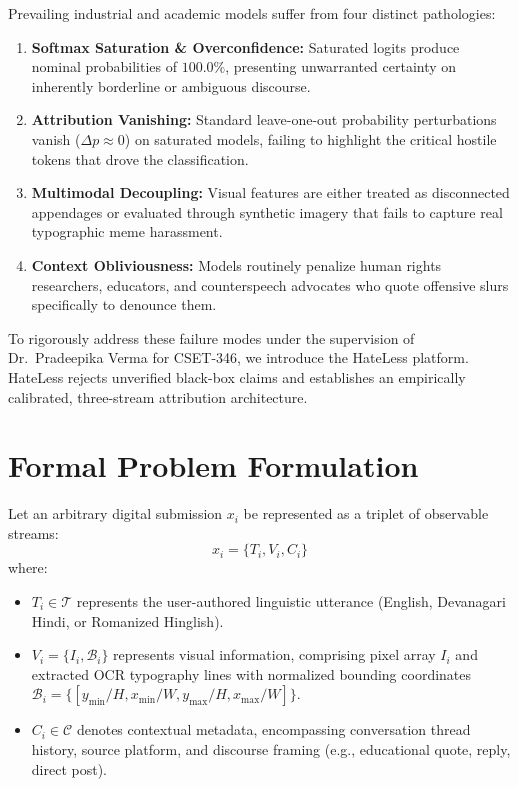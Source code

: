 \documentclass[11pt,a4paper]{article}
\begin{document}
Prevailing industrial and academic models suffer from four distinct pathologies:
\begin{enumerate}
    \item \textbf{Softmax Saturation \& Overconfidence:} Saturated logits produce nominal probabilities of $100.0\%$, presenting unwarranted certainty on inherently borderline or ambiguous discourse.
    \item \textbf{Attribution Vanishing:} Standard leave-one-out probability perturbations vanish ($\Delta p \approx 0$) on saturated models, failing to highlight the critical hostile tokens that drove the classification.
    \item \textbf{Multimodal Decoupling:} Visual features are either treated as disconnected appendages or evaluated through synthetic imagery that fails to capture real typographic meme harassment.
    \item \textbf{Context Obliviousness:} Models routinely penalize human rights researchers, educators, and counterspeech advocates who quote offensive slurs specifically to denounce them.
\end{enumerate}

To rigorously address these failure modes under the supervision of Dr.~Pradeepika Verma for CSET-346, we introduce the HateLess platform. HateLess rejects unverified black-box claims and establishes an empirically calibrated, three-stream attribution architecture.

\section{Formal Problem Formulation}
Let an arbitrary digital submission $x_i$ be represented as a triplet of observable streams:
\begin{equation}
    x_i = \{T_i, V_i, C_i\}
\end{equation}
where:
\begin{itemize}
    \item $T_i \in \mathcal{T}$ represents the user-authored linguistic utterance (English, Devanagari Hindi, or Romanized Hinglish).
    \item $V_i = \{I_i, \mathcal{B}_i\}$ represents visual information, comprising pixel array $I_i$ and extracted OCR typography lines with normalized bounding coordinates $\mathcal{B}_i = \{[y_{\min}/H, x_{\min}/W, y_{\max}/H, x_{\max}/W]\}$.
    \item $C_i \in \mathcal{C}$ denotes contextual metadata, encompassing conversation thread history, source platform, and discourse framing (e.g., educational quote, reply, direct post).
\end{itemize}
\end{document}
